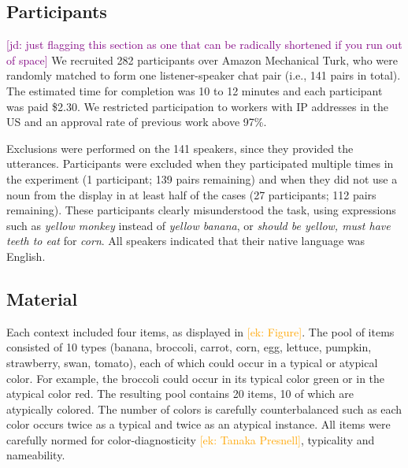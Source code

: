 \documentclass[10pt,letterpaper]{article}
\newcommand{\ek}[1]{\textcolor{Orange}{[ek: #1]}}
\newcommand{\jd}[1]{\textcolor{Purple}{[jd: #1]}}
\begin{document}
\subsection{Participants}
\jd{just flagging this section as one that can be radically shortened if you run out of space}
We recruited 282 participants over Amazon Mechanical Turk, who were randomly matched to form one listener-speaker chat pair (i.e., 141 pairs in total). 
The estimated time for completion was 10 to 12 minutes and each participant was paid \$2.30. We restricted participation to workers with IP addresses in the US and an approval rate of previous work above 97\%.

Exclusions were performed on the 141 speakers, since they provided the utterances. Participants were excluded when they participated multiple times in the experiment (1 participant; 139 pairs remaining) and when they did not use a noun from the display in at least half of the cases (27 participants; 112 pairs remaining). These participants clearly misunderstood the task, using expressions such as \textit{yellow monkey} instead of \textit{yellow banana}, or \textit{should be yellow, must have teeth to eat} for \textit{corn}. All speakers indicated that their native language was English.


\subsection{Material} \label{Material}
Each context included four items, as displayed in \ek{Figure}. The pool of items consisted of 10 types (banana, broccoli, carrot, corn, egg, lettuce, pumpkin, strawberry, swan, tomato), each of which could occur in a typical or atypical color. For example, the broccoli could occur in its typical color green or in the atypical color red. The resulting pool contains 20 items, 10 of which are atypically colored. The number of colors is carefully counterbalanced such as each color occurs twice as a typical and twice as an atypical instance. All items were carefully normed for color-diagnosticity \ek{Tanaka Presnell}, typicality and nameability.
\end{document}
